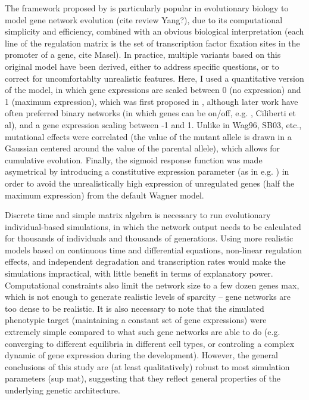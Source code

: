 \documentclass[10pt,a4paper]{article}
\begin{document}
The framework proposed by \citep{Wag94,Wag96} is particularly popular in evolutionary biology to model gene network evolution (cite review Yang?), due to its computational simplicity and efficiency, combined with an obvious biological interpretation (each line of the regulation matrix is the set of transcription factor fixation sites in the promoter of a gene, cite Masel). In practice, multiple variants based on this original model have been derived, either to address specific questions, or to correct for uncomfortablty unrealistic features. Here, I used a quantitative version of the model, in which gene expressions are scaled between 0 (no expression) and 1 (maximum expression), which was first proposed in \citep{Wag94}, although later work have often preferred  binary networks (in which genes can be on/off, e.g. \citep{Wag96}, Ciliberti et al), and a gene expression scaling between -1 and 1. Unlike in Wag96, SB03, etc., mutational effects were correlated (the value of the mutant allele is drawn in a Gaussian centered around the value of the parental allele), which allows for cumulative evolution. Finally, the sigmoid response function was made asymetrical by introducing a constitutive expression parameter (as in e.g. \citealp{RL16}) in order to avoid the unrealistically high expression of unregulated genes (half the maximum expression) from the default Wagner model. 

Discrete time and simple matrix algebra is necessary to run evolutionary individual-based simulations, in which the network output needs to be calculated for thousands of individuals and thousands of generations. Using more realistic models based on continuous time and differential equations, non-linear regulation effects, and independent degradation and transcription rates would make the simulations impractical, with little benefit in terms of explanatory power. Computational constraints also limit the network size to a few dozen genes max, which is not enough to generate realistic levels of sparcity -- gene networks are too dense to be realistic. It is also necessary to note that the simulated phenotypic target (maintaining a constant set of gene expressions) were extremely simple compared to what such gene networks are able to do (e.g. converging to different equilibria in different cell types, or controling a complex dynamic of gene expression during the development). However, the general conclusions of this study are (at least qualitatively) robust to most simulation parameters (sup mat), suggesting that they reflect general properties of the underlying genetic architecture. 
\end{document}
